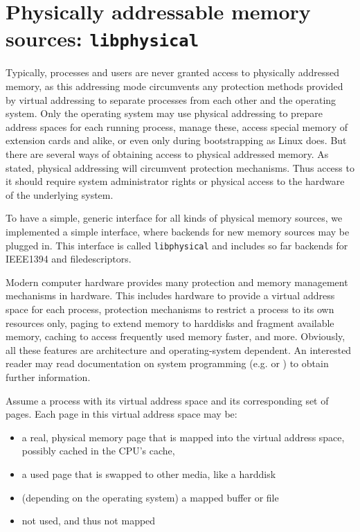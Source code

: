 %
%

\section{Physically addressable memory sources: \texttt{libphysical}}

\label{memsources}

Typically, processes and users are never granted access to physically addressed
memory, as this addressing mode circumvents any protection methods provided by
virtual addressing to separate processes from each other and the operating
system. Only the operating system may use physical addressing to prepare address
spaces for each running process, manage these, access special memory of
extension cards and alike, or even only during bootstrapping as Linux does. But
there are several ways of obtaining access to physical addressed memory. As
stated, physical addressing will circumvent protection me\-cha\-nisms. Thus
access to it should require system administrator rights or physical access to
the hardware of the underlying system.

To have a simple, generic interface for all kinds of physical memory sources, we
implemented a simple interface, where backends for new memory sources may be
plugged in. This interface is called \texttt{libphysical} and includes so far
backends for IEEE1394 and filedescriptors.

Modern computer hardware provides many protection and memory management
mechanisms in hardware. This includes hardware to provide a virtual address
space for each process, protection mechanisms to restrict a process to its own
resources only, paging to extend memory to harddisks and fragment available
memory, caching to access frequently used memory faster, and more. Obviously,
all these features are architecture and operating-system dependent. An
interested reader may read documentation on system programming (e.g\@.
\cite{rwth_syspro_scriptum:2002} or \cite{IA32_SDM_3a:2006,IA32_SDM_3b:2006}) to
obtain further information.

Assume a process with its virtual address space and its corresponding set of
pages. Each page in this virtual address space may be:

\begin{itemize}

	\item a real, physical memory page that is mapped into the virtual 
		address space, possibly cached in the CPU's cache,

	\item a used page that is swapped to other media, like a harddisk

	\item (depending on the operating system) a mapped buffer or file

	\item not used, and thus not mapped

\end{itemize}

